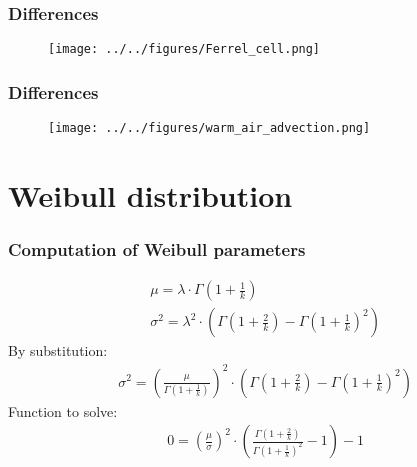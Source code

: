 \documentclass[12pt,t]{beamer}
\begin{document}
\begin{frame}
\frametitle{Differences}
\begin{figure}[H]
\centering
\texttt{[image: ../../figures/Ferrel\_cell.png]}
\label{fig:weatherpattern}
\end{figure}
\end{frame}


\begin{frame}
\frametitle{Differences}
\begin{figure}[H]
\centering
\texttt{[image: ../../figures/warm\_air\_advection.png]}
\label{fig:weatherpattern}
\end{figure}
\end{frame}





\section{Weibull distribution}

\begin{frame}
\frametitle{Computation of Weibull parameters}
\begin{align*}
&\mu = \lambda \cdot \Gamma\left(1+\frac{1}{k}\right) \\
&\sigma^2 = \lambda^2 \cdot \left(\Gamma\left(1+\frac{2}{k}\right)-\Gamma\left(1+\frac{1}{k}\right)^2\right)
\end{align*}
By substitution:
\begin{align*}
&\sigma^2 = \left(\frac{\mu}{\Gamma(1+\frac{1}{k})}\right)^2 \cdot \left(\Gamma\left({1+\frac{2}{k}}\right)-\Gamma\left(1+\frac{1}{k}\right)^2\right)
\end{align*}
Function to solve:
\begin{align*}
&0 = \left(\frac{\mu}{\sigma}\right)^2 \cdot \left(\frac{\Gamma\left({1+\frac{2}{k}}\right)}{\Gamma\left(1+\frac{1}{k}\right)^2}-1\right)-1
\end{align*}
\end{frame}
\end{document}

